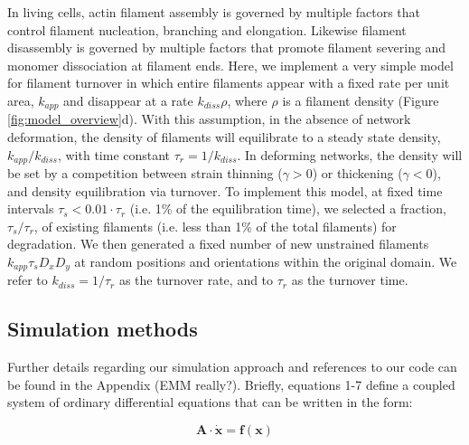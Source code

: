 \documentclass[10pt,letterpaper]{article}
\begin{document}
In living cells, actin filament assembly is governed by multiple factors that control filament nucleation, branching and elongation. Likewise filament disassembly is governed by multiple factors that promote filament severing and monomer dissociation at filament ends. Here, we implement a very simple model for filament turnover in which entire filaments appear with a fixed rate per unit area, $k_{app}$ and disappear at a rate $k_{diss}\rho$, where $\rho$ is a filament density (Figure \ref{fig:model_overview}d). With this assumption, in the absence of network deformation, the density of filaments will equilibrate to a steady state density, $k_{app}/k_{diss}$, with time constant $\tau_r = 1/k_{diss}$.   In deforming networks, the density will be set by a competition between strain thinning ($\gamma>0$) or thickening ($\gamma<0$), and density equilibration via turnover. To implement this model, at fixed time intervals $\tau_s < 0.01\cdot\tau_r$ (i.e. 1\% of the equilibration time), we selected a fraction, $\tau_s/\tau_r$, of existing filaments (i.e. less than 1\% of the total filaments) for degradation. We then generated a fixed number of new unstrained filaments $k_{app}\tau_sD_xD_y$ at random positions and orientations within the original domain.   We refer to $k_{diss}=1/\tau_r$ as the turnover rate, and to $\tau_r$ as the turnover time.


\subsection*{Simulation methods}

Further details regarding our simulation approach and references to our code can be found in the Appendix (EMM really?). Briefly, equations 1-7 define a coupled system of ordinary differential equations that can be written in the form:

\begin{equation}
\mathbf{A \cdot \dot x} = \mathbf{f(x)}
\end{equation}
\end{document}

